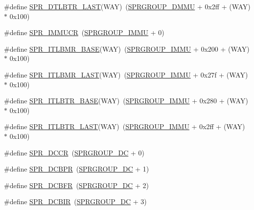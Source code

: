 \begin{DoxyCompactItemize}
\#define \hyperlink{spr-defs_8h_a5abfd1d2773694718517893d125f2430}{\-S\-P\-R\-\_\-\-D\-T\-L\-B\-T\-R\-\_\-\-L\-A\-S\-T}(\-W\-A\-Y)~(\hyperlink{spr-defs_8h_a9b7adb6ad3625a7d1f74f61b683b0a5e}{\-S\-P\-R\-G\-R\-O\-U\-P\-\_\-\-D\-M\-M\-U} + 0x2ff + (\-W\-A\-Y) $\ast$ 0x100)
\item 
\#define \hyperlink{spr-defs_8h_afc0cf6bc1904c9670958a04eb40835fd}{\-S\-P\-R\-\_\-\-I\-M\-M\-U\-C\-R}~(\hyperlink{spr-defs_8h_a41a63359a51148fda8341ba88648773e}{\-S\-P\-R\-G\-R\-O\-U\-P\-\_\-\-I\-M\-M\-U} + 0)
\item 
\#define \hyperlink{spr-defs_8h_a167ad48f8e43642a222785c0b34e3376}{\-S\-P\-R\-\_\-\-I\-T\-L\-B\-M\-R\-\_\-\-B\-A\-S\-E}(\-W\-A\-Y)~(\hyperlink{spr-defs_8h_a41a63359a51148fda8341ba88648773e}{\-S\-P\-R\-G\-R\-O\-U\-P\-\_\-\-I\-M\-M\-U} + 0x200 + (\-W\-A\-Y) $\ast$ 0x100)
\item 
\#define \hyperlink{spr-defs_8h_a9575fc83fe9fe119d68b980b366f7325}{\-S\-P\-R\-\_\-\-I\-T\-L\-B\-M\-R\-\_\-\-L\-A\-S\-T}(\-W\-A\-Y)~(\hyperlink{spr-defs_8h_a41a63359a51148fda8341ba88648773e}{\-S\-P\-R\-G\-R\-O\-U\-P\-\_\-\-I\-M\-M\-U} + 0x27f + (\-W\-A\-Y) $\ast$ 0x100)
\item 
\#define \hyperlink{spr-defs_8h_a454f5d4cd9fd75f476501ec500be419a}{\-S\-P\-R\-\_\-\-I\-T\-L\-B\-T\-R\-\_\-\-B\-A\-S\-E}(\-W\-A\-Y)~(\hyperlink{spr-defs_8h_a41a63359a51148fda8341ba88648773e}{\-S\-P\-R\-G\-R\-O\-U\-P\-\_\-\-I\-M\-M\-U} + 0x280 + (\-W\-A\-Y) $\ast$ 0x100)
\item 
\#define \hyperlink{spr-defs_8h_a009f596f1dcfccd68c42a7f2abd3055b}{\-S\-P\-R\-\_\-\-I\-T\-L\-B\-T\-R\-\_\-\-L\-A\-S\-T}(\-W\-A\-Y)~(\hyperlink{spr-defs_8h_a41a63359a51148fda8341ba88648773e}{\-S\-P\-R\-G\-R\-O\-U\-P\-\_\-\-I\-M\-M\-U} + 0x2ff + (\-W\-A\-Y) $\ast$ 0x100)
\item 
\#define \hyperlink{spr-defs_8h_a41b097dccf4f756d2d74a0cea3415ac7}{\-S\-P\-R\-\_\-\-D\-C\-C\-R}~(\hyperlink{spr-defs_8h_a3af62c82d89656aca627f13a831ad9f6}{\-S\-P\-R\-G\-R\-O\-U\-P\-\_\-\-D\-C} + 0)
\item 
\#define \hyperlink{spr-defs_8h_ac27e7eb1ea3a0ba058ed513551ec567b}{\-S\-P\-R\-\_\-\-D\-C\-B\-P\-R}~(\hyperlink{spr-defs_8h_a3af62c82d89656aca627f13a831ad9f6}{\-S\-P\-R\-G\-R\-O\-U\-P\-\_\-\-D\-C} + 1)
\item 
\#define \hyperlink{spr-defs_8h_af4cd5dd1b729b97187901761197164f0}{\-S\-P\-R\-\_\-\-D\-C\-B\-F\-R}~(\hyperlink{spr-defs_8h_a3af62c82d89656aca627f13a831ad9f6}{\-S\-P\-R\-G\-R\-O\-U\-P\-\_\-\-D\-C} + 2)
\item 
\#define \hyperlink{spr-defs_8h_af5132700a309386910117ff3a61d6d7e}{\-S\-P\-R\-\_\-\-D\-C\-B\-I\-R}~(\hyperlink{spr-defs_8h_a3af62c82d89656aca627f13a831ad9f6}{\-S\-P\-R\-G\-R\-O\-U\-P\-\_\-\-D\-C} + 3)

\end{DoxyCompactItemize}
